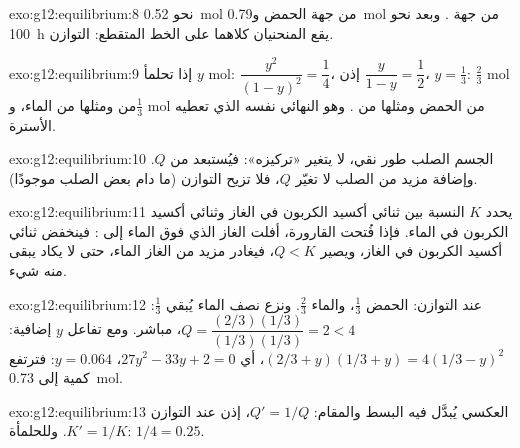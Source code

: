 \begin{solution}{exo:g12:equilibrium:8}
نحو \qty{0.52}{mol} من جهة الحمض و\qty{0.79}{mol} من جهة
. وبعد نحو \qty{100}{h} يقع المنحنيان كلاهما على الخط المتقطع:
التوازن.
\end{solution}

\begin{solution}{exo:g12:equilibrium:9}
إذا تحلمأ $y$ mol: $\dfrac{y^2}{(1-y)^2} = \dfrac{1}{4}$، إذن
$\dfrac{y}{1-y} = \dfrac{1}{2}$، $y = \frac{1}{3}$: $\frac{2}{3}$ mol من
 ومثلها من الماء، و$\frac{1}{3}$ mol من الحمض ومثلها من . وهو
 النهائي نفسه الذي تعطيه الأسترة.
\end{solution}

\begin{solution}{exo:g12:equilibrium:10}
الجسم الصلب طور نقي، لا يتغير «تركيزه»: فيُستبعد
من $Q$. وإضافة مزيد من الصلب لا تغيّر $Q$، فلا
تزيح التوازن (ما دام بعض الصلب موجودًا).
\end{solution}

\begin{solution}{exo:g12:equilibrium:11}
يحدد $K$ النسبة بين ثنائي أكسيد الكربون في الغاز وثنائي أكسيد الكربون في الماء.
فإذا فُتحت القارورة، أفلت الغاز الذي فوق الماء إلى : فينخفض ثنائي أكسيد الكربون
في الغاز، ويصير $Q < K$، فيغادر مزيد من الغاز الماء، حتى لا يكاد
يبقى منه شيء.
\end{solution}

\begin{solution}{exo:g12:equilibrium:12}
عند التوازن: الحمض  $\frac{1}{3}$،  والماء
$\frac{2}{3}$. ونزع نصف الماء يُبقي $\frac{1}{3}$:
$Q = \dfrac{(2/3)(1/3)}{(1/3)(1/3)} = 2 < 4$، مباشر. ومع تفاعل $y$
إضافية: $(2/3 + y)(1/3 + y) = 4(1/3 - y)^2$، أي
$27y^2 - 33y + 2 = 0$، $y = 0.064$: فترتفع كمية  إلى \qty{0.73}{mol}.
\end{solution}

\begin{solution}{exo:g12:equilibrium:13}
 العكسي يُبدَّل فيه البسط
والمقام: $Q' = 1/Q$، إذن عند التوازن $K' = 1/K$. وللحلمأة:
$1/4 = 0.25$.
\end{solution}

